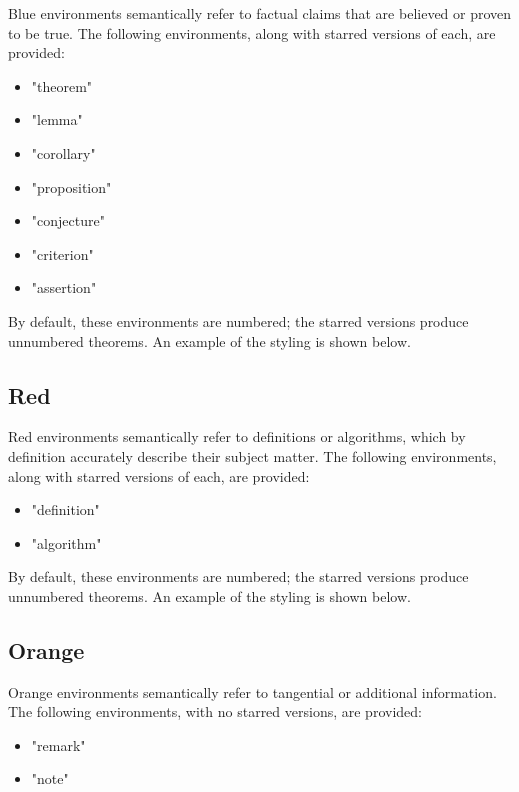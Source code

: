 \documentclass{l3doc}
\begin{document}
Blue environments semantically refer to factual claims that are believed or proven to be true. The following environments, along with starred versions of each, are provided: \begin{itemize}
  \item "theorem"
  \item "lemma"
  \item "corollary"
  \item "proposition"
  \item "conjecture"
  \item "criterion"
  \item "assertion"
\end{itemize}

By default, these environments are numbered; the starred versions produce unnumbered theorems. An example of the styling is shown below.

\begin{theorem*}
  \lipsum[1][1-6]
\end{theorem*}

\subsection{Red}

Red environments semantically refer to definitions or algorithms, which by definition accurately describe their subject matter. The following environments, along with starred versions of each, are provided: \begin{itemize}
  \item "definition"
  \item "algorithm"
\end{itemize}

By default, these environments are numbered; the starred versions produce unnumbered theorems. An example of the styling is shown below.

\begin{definition*}
  \lipsum[1][1-6]
\end{definition*}

\subsection{Orange}

Orange environments semantically refer to tangential or additional information. The following environments, with no starred versions, are provided: \begin{itemize}
  \item "remark"
  \item "note"
\end{itemize}
\end{document}
